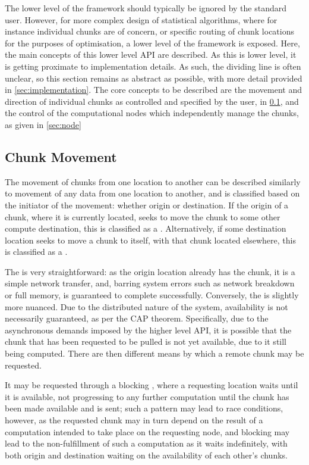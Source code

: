 The lower level of the \lsr{} framework should typically be ignored by the standard user.
However, for more complex design of statistical algorithms, where for instance individual chunks are of concern, or specific routing of chunk locations for the purposes of optimisation, a lower level of the framework is exposed.
Here, the main concepts of this lower level API are described.
As this is lower level, it is getting proximate to implementation details.
As such, the dividing line is often unclear, so this section remains as abstract as possible, with more detail provided in \cref{sec:implementation}.
The core concepts to be described are the movement and direction of individual chunks as controlled and specified by the user, in \cref{sec:cm}, and the control of the computational nodes which independently manage the chunks, as given in \cref{sec:node}

\subsection{Chunk Movement}\label{sec:cm}

The movement of chunks from one location to another can be described similarly to movement of any data from one location to another, and is classified based on the initiator of the movement: whether origin or destination.
If the origin of a chunk, where it is currently located, seeks to move the chunk to some other compute destination, this is classified as a .
Alternatively, if some destination location seeks to move a chunk to itself, with that chunk located elsewhere, this is classified as a .

The  is very straightforward: as the origin location already has the chunk, it is a simple network transfer, and, barring system errors such as network breakdown or full memory, is guaranteed to complete successfully.
Conversely, the  is slightly more nuanced.
Due to the distributed nature of the system, availability is not necessarily guaranteed, as per the CAP theorem\cite{gilbert2002brewer}.
Specifically, due to the asynchronous demands imposed by the higher level API, it is possible that the chunk that has been requested to be pulled is not yet available, due to it still being computed.
There are then different means by which a remote chunk may be requested.

It may be requested through a blocking , where a requesting location waits until it is available, not progressing to any further computation until the chunk has been made available and is sent; such a pattern may lead to race conditions, however, as the requested chunk may in turn depend on the result of a computation intended to take place on the requesting node, and blocking may lead to the non-fulfillment of such a computation as it waits indefinitely, with both origin and destination waiting on the availability of each other's chunks.

